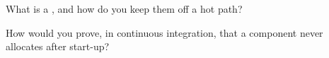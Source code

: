 \begin{interviewq}\label{iq:ll:cpp-for-latency-i-memory:5}
What is a , and how do you keep them off a hot path?
\end{interviewq}

\begin{interviewq}\label{iq:ll:cpp-for-latency-i-memory:6}
How would you prove, in continuous integration, that a component never allocates after start-up?
\end{interviewq}
